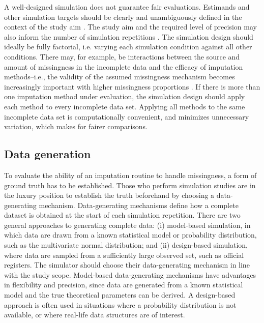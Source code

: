 \documentclass[bimj,fleqn]{w-art}
\begin{document}
A well-designed simulation does not guarantee fair evaluations. Estimands and other simulation targets should be clearly and unambiguously defined in the context of the study aim \citep{pete14}. The study aim and the required level of precision may also inform the number of simulation repetitions \citep[e.g. as determined from a maximum tolerable level of uncertainty in terms of a performance measure's Monte Carlo error; see][]{morr18}. The simulation design should ideally be fully factorial, i.e. varying each simulation condition against all other conditions. There may, for example, be interactions between the source and amount of missingness in the incomplete data and the efficacy of imputation methods--i.e., the validity of the assumed missingness mechanism becomes increasingly important with higher missingness proportions \citep{scho18}. If there is more than one imputation method under evaluation, the simulation design should apply each method to every incomplete data set. Applying all methods to the same incomplete data set is computationally convenient, and minimizes unnecessary variation, which makes for fairer comparisons.


\subsection{Data generation}

To evaluate the ability of an imputation routine to handle missingness, a form of ground  truth has to be established. Those who perform simulation studies are in the luxury position to establish the truth beforehand by choosing a data-generating mechanism. Data-generating mechanisms define how a complete dataset is obtained at the start of each simulation repetition. There are two general approaches to generating complete data: (i) model-based simulation, in which data are drawn from a known statistical model or probability distribution, such as the multivariate normal distribution; and (ii) design-based simulation, where data are sampled from a sufficiently large observed set, such as official registers. The simulator should choose their data-generating mechanism in line with the study scope. Model-based data-generating mechanisms have advantages in flexibility and precision, since data are generated from a known statistical model and the true theoretical parameters can be derived. A design-based approach is often used in situations where a probability distribution is not available, or where real-life data structures are of interest.
\end{document}
